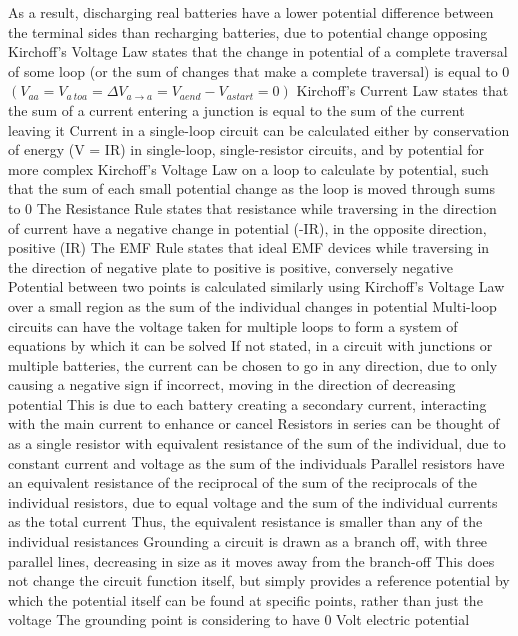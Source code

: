 \documentclass[11 pt, twoside]{article}
\newenvironment{outline*}
{
	\begin{outline}[enumerate]
	}
	{\end{outline}
}
\begin{document}
\begin{outline*}
\4 As a result, discharging real batteries have a lower potential difference between the terminal sides than recharging batteries, due to potential change opposing
\1 Kirchoff's Voltage Law states that the change in potential of a complete traversal of some loop (or the sum of changes that make a complete traversal) is equal to 0 $(V_{aa} = V_{a\ to a} = \Delta V_{a \to a} = V_{aend} - V_{astart} = 0)$
\2 Kirchoff's Current Law states that the sum of a current entering a junction is equal to the sum of the current leaving it
\1 Current in a single-loop circuit can be calculated either by conservation of energy (V = IR) in single-loop, single-resistor circuits, and by potential for more complex
\2 Kirchoff's Voltage Law on a loop to calculate by potential, such that the sum of each small potential change as the loop is moved through sums to 0
\3 The Resistance Rule states that resistance while traversing in the direction of current have a negative change in potential (-IR), in the opposite direction, positive (IR)
\3 The EMF Rule states that ideal EMF devices while traversing in the direction of negative plate to positive is positive, conversely negative
\2 Potential between two points is calculated similarly using Kirchoff's Voltage Law over a small region as the sum of the individual changes in potential
\2 Multi-loop circuits can have the voltage taken for multiple loops to form a system of equations by which it can be solved
\2 If not stated, in a circuit with junctions or multiple batteries, the current can be chosen to go in any direction, due to only causing a negative sign if incorrect, moving in the direction of decreasing potential
\3 This is due to each battery creating a secondary current, interacting with the main current to enhance or cancel
\1 Resistors in series can be thought of as a single resistor with equivalent resistance of the sum of the individual, due to constant current and voltage as the sum of the individuals
\2 Parallel resistors have an equivalent resistance of the reciprocal of the sum of the reciprocals of the individual resistors, due to equal voltage and the sum of the individual currents as the total current
\3 Thus, the equivalent resistance is smaller than any of the individual resistances
\1 Grounding a circuit is drawn as a branch off, with three parallel lines, decreasing in size as it moves away from the branch-off
\2 This does not change the circuit function itself, but simply provides a reference potential by which the potential itself can be found at specific points, rather than just the voltage
\2 The grounding point is considering to have 0 Volt electric potential

\end{outline*}
\end{document}

